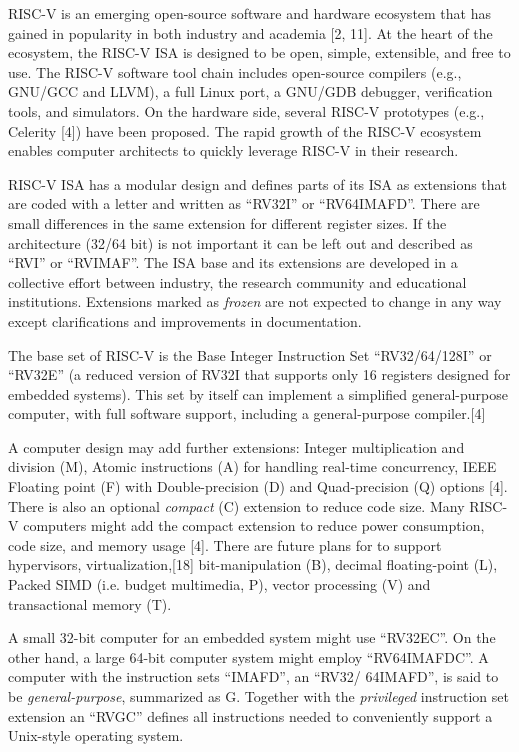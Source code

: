 
\label{sec:bak}
RISC-V is an emerging open-source software and hardware ecosystem that has gained in popularity in both industry and academia [2, 11]. At the heart of the ecosystem, the RISC-V ISA is designed to be open, simple, extensible, and free to use. The RISC-V software tool chain includes open-source compilers (e.g., GNU/GCC and LLVM), a full Linux port, a GNU/GDB debugger, verification tools, and simulators. On the hardware side, several RISC-V prototypes (e.g., Celerity [4]) have been proposed. The rapid growth of the RISC-V ecosystem enables computer architects to quickly leverage RISC-V in their research.

RISC-V ISA has a modular design and defines parts of its ISA as extensions that are coded with a letter and written as ``RV32I'' or ``RV64IMAFD''. There are small differences in the same extension for different register sizes. If the architecture (32/64 bit) is not important it can be left out and described as ``RVI'' or ``RVIMAF''. The ISA base and its extensions are developed in a collective effort between industry, the research community and educational institutions. Extensions marked as \emph{frozen} are not expected to change in any way except clarifications and improvements in documentation.

The base set of RISC-V is the Base Integer Instruction Set ``RV32/64/128I'' or ``RV32E'' (a reduced version of RV32I that supports only 16 registers designed for embedded systems). This set by itself can implement a simplified general-purpose computer, with full software support, including a general-purpose compiler.[4]

A computer design may add further extensions: Integer multiplication and division (M), Atomic instructions (A) for handling real-time concurrency, IEEE Floating point (F) with Double-precision (D) and Quad-precision (Q) options [4]. There is also an optional \emph{compact} (C) extension to reduce code size. Many RISC-V computers might add the compact extension to reduce power consumption, code size, and memory usage [4]. There are future plans for to support hypervisors, virtualization,[18] bit-manipulation (B), decimal floating-point (L), Packed SIMD (i.e. budget multimedia, P), vector processing (V) and transactional memory (T).

A small 32-bit computer for an embedded system might use ``RV32EC''. On the other hand, a large 64-bit computer system might employ ``RV64IMAFDC''. A computer with the instruction sets ``IMAFD'', an ``RV32/ 64IMAFD'', is said to be \emph{general-purpose}, summarized as G. Together with the \emph{privileged} instruction set extension an ``RVGC'' defines all instructions needed to conveniently support a Unix-style operating system.


